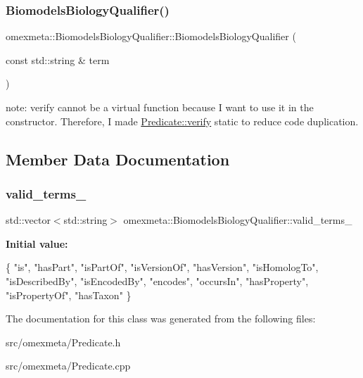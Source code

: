 \subsubsection{\texorpdfstring{Biomodels\+Biology\+Qualifier()}{BiomodelsBiologyQualifier()}}
{\footnotesize\ttfamily omexmeta\+::\+Biomodels\+Biology\+Qualifier\+::\+Biomodels\+Biology\+Qualifier (\begin{DoxyParamCaption}\item[{const std\+::string \&}]{term }\end{DoxyParamCaption})\hspace{0.3cm}{\ttfamily [explicit]}}

note\+: verify cannot be a virtual function because I want to use it in the constructor. Therefore, I made \hyperlink{classomexmeta_1_1Predicate_a1e7e59b8a48c9f89eeec73f3bbaea19c}{Predicate\+::verify} static to reduce code duplication.

\subsection{Member Data Documentation}
\mbox{\label{classomexmeta_1_1BiomodelsBiologyQualifier_a5ae1a3da58f05beb1e8b389f36f486bf}} 
\subsubsection{\texorpdfstring{valid\+\_\+terms\+\_\+}{valid\_terms\_}}
{\footnotesize\ttfamily std\+::vector$<$std\+::string$>$ omexmeta\+::\+Biomodels\+Biology\+Qualifier\+::valid\+\_\+terms\+\_\+}

{\bfseries Initial value\+:}
\begin{DoxyCode}
\{
                \textcolor{stringliteral}{"is"},
                \textcolor{stringliteral}{"hasPart"},
                \textcolor{stringliteral}{"isPartOf"},
                \textcolor{stringliteral}{"isVersionOf"},
                \textcolor{stringliteral}{"hasVersion"},
                \textcolor{stringliteral}{"isHomologTo"},
                \textcolor{stringliteral}{"isDescribedBy"},
                \textcolor{stringliteral}{"isEncodedBy"},
                \textcolor{stringliteral}{"encodes"},
                \textcolor{stringliteral}{"occursIn"},
                \textcolor{stringliteral}{"hasProperty"},
                \textcolor{stringliteral}{"isPropertyOf"},
                \textcolor{stringliteral}{"hasTaxon"}
        \}
\end{DoxyCode}


The documentation for this class was generated from the following files\+:\begin{DoxyCompactItemize}
\item 
src/omexmeta/Predicate.\+h\item 
src/omexmeta/Predicate.\+cpp\end{DoxyCompactItemize}
